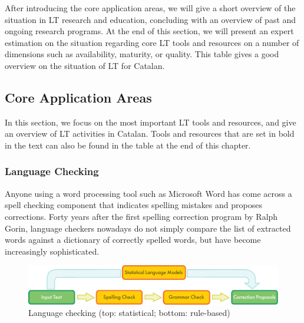 \begin{multicols}{2}

After introducing the core application areas, we will give a short overview of the situation in LT research and education, concluding with an overview of past and ongoing research programs. At the end of this section, we will present an expert estimation on the situation regarding core LT tools and resources on a number of dimensions such as availability, maturity, or quality. This table gives a good overview on the situation of LT for Catalan.

\subsection{Core Application Areas}

    In this section, we focus on the most important LT tools and resources, and give an overview of LT activities in Catalan. Tools and resources that are set in bold in the text can also be found in the table at the end of this chapter.


\subsubsection{Language Checking}

Anyone using a word processing tool such as Microsoft Word has come across a spell checking component that indicates spelling mistakes and proposes corrections. Forty years after the first spelling correction program by Ralph Gorin, language checkers nowadays do not simply compare the list of extracted words against a dictionary of correctly spelled words, but have become increasingly sophisticated. 

\begin{figure}[htb]
  \center
  \includegraphics[width=\textwidth]{../_media/english/language_checking}
  \caption{Language checking (top: statistical; bottom: rule-based)}
  \label{fig:langcheckingaarch_en}
\end{figure}


\end{multicols}
